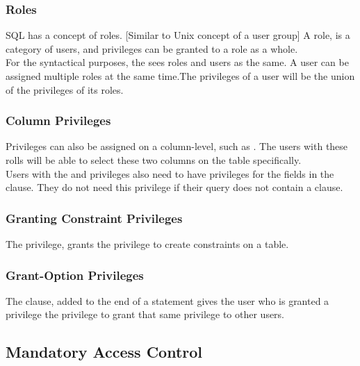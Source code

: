 \documentclass[11pt,a4paper,twocolumn]{book}
\begin{document}
\subsubsection{Roles}

SQL has a concept of roles. [Similar to Unix concept of a user group] A role, is a category of users, and privileges can be granted to a role as a whole.\\

For the syntactical purposes, the  sees roles and users as the same. A user can be assigned multiple roles at the same time.The privileges of a user will be the union of the privileges of its roles.

\subsubsection{Column Privileges}

Privileges can also be assigned on a column-level, such as . The users with these rolls will be able to select these two columns on the  table specifically.\\

Users with the  and  privileges also need to have  privileges for the fields in the  clause. They do not need this privilege if their query does not contain a  clause.\\

\subsubsection{Granting Constraint Privileges}

The  privilege, grants the privilege to create constraints on a table.

\subsubsection{Grant-Option Privileges}

The  clause, added to the end of a  statement gives the user who is granted a privilege the privilege to grant that same privilege to other users.

\subsection{Mandatory Access Control}
\end{document}
